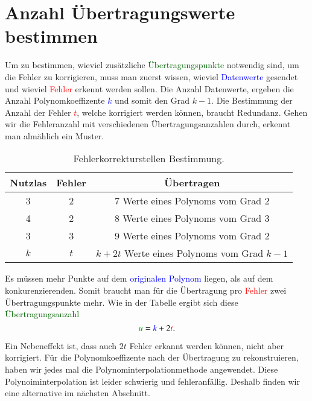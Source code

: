 \section{Anzahl Übertragungswerte bestimmen
\label{reedsolomon:section:Fehlerkorrekturstellen}}
Um zu bestimmen, wieviel zusätzliche \textcolor{darkgreen}{Übertragungspunkte} notwendig sind, um die Fehler zu korrigieren,
    muss man zuerst wissen, wieviel \textcolor{blue}{Datenwerte} gesendet und wieviel \textcolor{red}{Fehler} erkennt werden sollen. 
Die Anzahl Datenwerte, ergeben die Anzahl Polynomkoeffizente \textcolor{blue}{$k$} und somit den Grad $k-1$.
Die Bestimmung der Anzahl der Fehler \textcolor{red}{$t$}, welche korrigiert werden können, braucht Redundanz.
Gehen wir die Fehleranzahl mit verschiedenen Übertragungsanzahlen durch, 
    erkennt man almählich ein Muster.
\begin{table}%
    \centering
    \begin{tabular}{ c c | c} 
        \hline
        Nutzlas & Fehler & Übertragen \\
        \hline 
        3 & 2 & 7 Werte eines Polynoms vom Grad 2 \\ 
        4 & 2 & 8 Werte eines Polynoms vom Grad 3 \\
        3 & 3 & 9 Werte eines Polynoms vom Grad 2 \\ 
        \hline
        $k$ & $t$ & $k+2t$ Werte eines Polynoms vom Grad $k-1$ \\ 
        \hline
    \end{tabular}
    \caption{ Fehlerkorrekturstellen Bestimmung.}
    \label{tab:fehlerkorrekturstellen}
\end{table}
\par 
Es müssen mehr Punkte auf dem \textcolor{blue}{originalen Polynom} liegen, als auf dem konkurenzierenden.
Somit braucht man für die Übertragung pro \textcolor{red}{Fehler} zwei Übertragungspunkte mehr.
Wie in der Tabelle ergibt sich diese \textcolor{darkgreen}{Übertragungsanzahl}
\begin{equation}
    \textcolor{darkgreen}{u}=
    \textcolor{blue}{k}+2\textcolor{red}{t}.
    \label{reedsolomon:equation2}
\end{equation}

Ein Nebeneffekt ist, dass auch $2t$ Fehler erkannt werden können, nicht aber korrigiert.
Für die Polynomkoeffizente nach der Übertragung zu rekonstruieren, 
    haben wir jedes mal die Polynominterpolationmethode angewendet.
Diese Polynoiminterpolation ist leider schwierig und fehleranfällig.
Deshalb finden wir eine alternative im nächsten Abschnitt.


